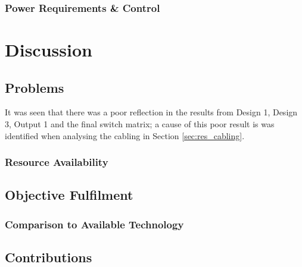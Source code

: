 \documentclass[12pt,openany,a4paper]{book}
\begin{document}
\subsection{Power Requirements \& Control}









\chapter{Discussion}
\section{Problems}
It was seen that there was a poor reflection in the results from Design 1, Design 3, Output 1 and the final switch matrix; a cause of this poor result is was identified when analysing the cabling in Section \ref{sec:res_cabling}. 

%		

\subsection{Resource Availability}


\section{Objective Fulfilment}


\subsection{Comparison to Available Technology}


\section{Contributions}





\end{document}
